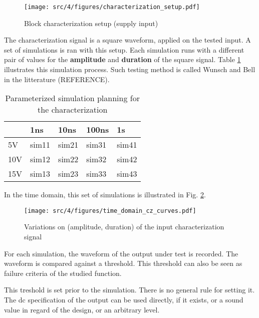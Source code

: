 \begin{figure}[!h]
  \centering
  \texttt{[image: src/4/figures/characterization\_setup.pdf]}
  \caption{Block characterization setup (supply input)}
  \label{block_function_cz}
\end{figure}

The characterization signal is a square waveform, applied on the tested input.
A set of simulations is ran with this setup.
Each simulation runs with a different pair of values for the \textbf{amplitude} and \textbf{duration} of the square signal.
Table \ref{parameterized-simulations} illustrates this simulation process.
Such testing method is called Wunsch and Bell in the litterature (REFERENCE).

\begin{table}[!h]
\centering
\begin{tabular}{@{}lllll@{}}
\toprule
    & 1ns   & 10ns  & 100ns & 1\textmugreek{}s   \\ \midrule
5V  & sim11 & sim21 & sim31 & sim41 \\
10V & sim12 & sim22 & sim32 & sim42 \\
15V & sim13 & sim23 & sim33 & sim43 \\ \bottomrule
\end{tabular}
\caption{Parameterized simulation planning for the characterization}
\label{parameterized-simulations}
\end{table}

In the time domain, this set of simulations is illustrated in Fig. \ref{set_input_signals}.

\begin{figure}[!h]
  \centering
  \texttt{[image: src/4/figures/time\_domain\_cz\_curves.pdf]}
  \caption{Variations on (amplitude, duration) of the input characterization signal}
  \label{set_input_signals}
\end{figure}

For each simulation, the waveform of the output under test is recorded.
The waveform is compared against a threshold.
This threshold can also be seen as failure criteria of the studied function.

This treshold is set prior to the simulation.
There is no general rule for setting it.
The \gls{dc} specification of the output can be used directly, if it exists, or a sound value in regard of the design, or an arbitrary level.

